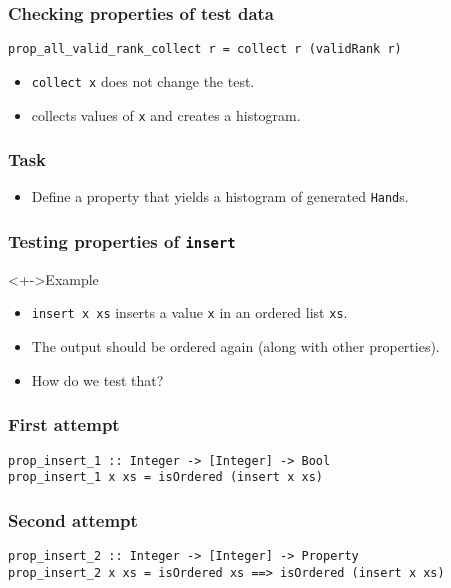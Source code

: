 \documentclass{beamer}
\begin{document}
\begin{frame}[fragile]
  \frametitle{Checking properties of test data}
\begin{verbatim}
prop_all_valid_rank_collect r = collect r (validRank r)
\end{verbatim}
  \begin{itemize}
  \item \texttt{collect x} does not change the test.
  \item collects values of \texttt{x} and creates a histogram.
  \end{itemize}
\end{frame}
\begin{frame}[fragile]
  \frametitle{Task}
  \begin{itemize}
  \item Define a property that yields a histogram of generated \texttt{Hand}s.
  \end{itemize}
\end{frame}
\begin{frame}
  \frametitle{Testing properties of \texttt{insert}}
  \onslide<+->{}
  \begin{block}<+->{Example}
  \begin{itemize}
  \item \texttt{insert x xs} inserts a value \texttt{x} in an ordered list \texttt{xs}.
  \item The output should be ordered again (along with other properties).
  \item How do we test that?
  \end{itemize}
\end{block}
\end{frame}
\begin{frame}[fragile]
  \frametitle{First attempt}
\begin{verbatim}
prop_insert_1 :: Integer -> [Integer] -> Bool
prop_insert_1 x xs = isOrdered (insert x xs)
\end{verbatim}
\end{frame}
\begin{frame}[fragile]
  \frametitle{Second attempt}
\begin{verbatim}
prop_insert_2 :: Integer -> [Integer] -> Property
prop_insert_2 x xs = isOrdered xs ==> isOrdered (insert x xs)
\end{verbatim}
\end{frame}
\end{document}
